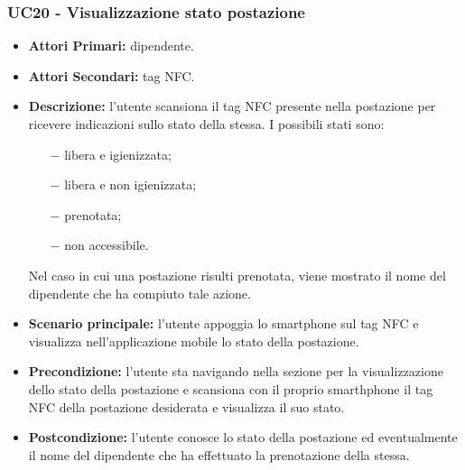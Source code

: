 \subsubsection{ UC20 - Visualizzazione stato postazione}
\begin{itemize}
	\item\textbf{Attori Primari:} dipendente.
	\item\textbf{Attori Secondari:} tag NFC.
	\item\textbf{Descrizione:} l’utente scansiona il tag NFC presente nella postazione per ricevere indicazioni sullo stato della stessa. I possibili stati sono:
	\begin{itemize}
		\item[$-$]libera e igienizzata;
		\item[$-$]libera e non igienizzata;
		\item[$-$]prenotata;
		\item[$-$]non accessibile.
	\end{itemize}
	Nel caso in cui una postazione risulti prenotata, viene mostrato il nome del dipendente che ha compiuto tale azione.
	\item\textbf{Scenario principale:} l’utente appoggia lo smartphone sul tag NFC e visualizza nell'applicazione mobile lo stato della postazione. 
	\item\textbf{Precondizione:} l’utente sta navigando nella sezione per la visualizzazione dello stato della postazione e 
	scansiona con il proprio smarthphone il tag NFC della postazione desiderata e visualizza il suo stato.
	\item\textbf{Postcondizione:} l’utente conosce lo stato della postazione ed eventualmente il nome del dipendente che ha effettuato la prenotazione della stessa.
\end{itemize}


